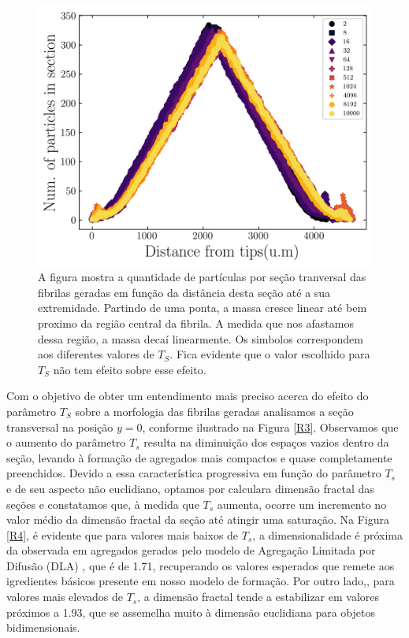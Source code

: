 \documentclass{report}
\begin{document}
    
        \begin{figure}[H]
            \centering
            \includegraphics[width=\textwidth]{figures/tips.png}
    
            \caption{A figura mostra a quantidade de partículas por seção tranversal das fibrilas geradas em função da 
            distância desta seção até a sua extremidade. Partindo de uma ponta, a massa cresce linear até bem proximo 
            da região central da fibrila. A medida que nos afastamos dessa região, a massa decaí linearmente. Os simbolos 
            correspondem aos diferentes valores de $T_{S}$. Fica evidente que o valor escolhido para $T_{S}$ não tem 
            efeito sobre esse efeito.} 
    
            \label{R2}
        \end{figure}
    
    
        Com o objetivo de obter um entendimento mais preciso acerca do efeito do parâmetro $T_{S}$ sobre a morfologia das 
        fibrilas geradas analisamos a seção transversal na posição \(y=0\), conforme ilustrado na Figura \ref{R3}. Observamos 
        que o aumento do parâmetro \(T_{s}\) resulta na diminuição dos espaços vazios dentro da seção, levando à formação de 
        agregados mais compactos e quase completamente preenchidos. Devido a essa característica progressiva em função do 
        parâmetro \(T_{s}\) e de seu aspecto não euclidiano, optamos por calculara dimensão fractal das seções e constatamos que, à medida que \(T_{s}\) aumenta, ocorre um 
        incremento no valor médio da dimensão fractal da seção até atingir uma saturação. Na Figura \ref{R4}, é evidente 
        que para valores mais baixos de \(T_{s}\), a dimensionalidade é próxima da observada em agregados gerados pelo 
        modelo de Agregação Limitada por Difusão (DLA) \cite{Witten1983}, que é de 1.71, recuperando os valores esperados 
        que remete aos igredientes básicos presente em nosso modelo de formação. Por outro lado,, para valores mais elevados 
        de \(T_{s}\), a dimensão fractal tende a estabilizar em valores próximos a 1.93, que se assemelha muito à dimensão 
        euclidiana para objetos bidimensionais. 
    
\end{document}
